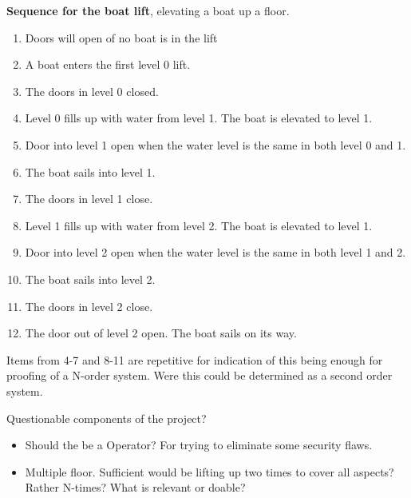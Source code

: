 \documentclass{article}
\begin{document}
\pagebreak

\textbf{Sequence for the boat lift}, elevating a boat up a floor.

\begin{enumerate}
	\item Doors will open of no boat is in the lift
	\item A boat enters the first level 0 lift.
	\item The doors in level 0 closed.
	
	\item Level 0 fills up with water from level 1. The boat is elevated to level 1.
	\item Door into level 1 open when the water level is the same in both level 0 and 1.
	\item The boat sails into level 1.
	\item The doors in level 1 close.
	
	\item Level 1 fills up with water from level 2. The boat is elevated to level 1.
	\item Door into level 2 open when the water level is the same in both level 1 and 2.
	\item The boat sails into level 2.
	\item The doors in level 2 close.
	
	\item The door out of level 2 open. The boat sails on its way. 
\end{enumerate}

Items from 4-7 and 8-11 are repetitive for indication of this being enough for proofing of a N-order system. Were this could be determined as a second order system.

\pagebreak

Questionable components of the project?
\begin{itemize}
	\item Should the be a Operator? For trying to eliminate some security flaws.
	\item Multiple floor. Sufficient would be lifting up two times to cover all aspects? Rather N-times?  What is relevant or doable?
\end{itemize}
\end{document}
